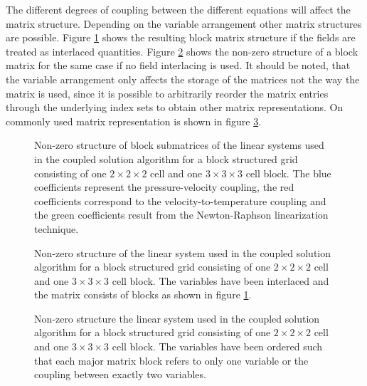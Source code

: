 The different degrees of coupling between the different equations will affect the matrix structure. Depending on the variable arrangement other matrix structures are possible. Figure \ref{fig:cpldassemble} shows the resulting block matrix structure if the fields are treated as interlaced quantities. Figure \ref{fig:interlacemat} shows the non-zero structure of a block matrix for the same case if no field interlacing is used. It should be noted, that the variable arrangement only affects the storage of the matrices not the way the matrix is used, since it is possible to arbitrarily reorder the matrix entries through the underlying index sets to obtain other matrix representations. On commonly used matrix representation is shown in figure \ref{fig:nointerlacemat}.

\begin{figure}
  \centering
  \label{fig:cpldassemble}
  
  \caption{Non-zero structure of block submatrices of the linear systems used in the coupled solution algorithm for a block structured grid consisting of one $2\times2\times2$ cell and one $3\times3\times3$ cell block. The blue coefficients represent the pressure-velocity coupling, the red coefficients correspond to the velocity-to-temperature coupling and the green coefficients result from the Newton-Raphson linearization technique.}
\end{figure}

\begin{figure}
  \centering
  \label{fig:interlacemat}
  
  \caption{Non-zero structure of the linear system used in the coupled solution algorithm for a block structured grid consisting of one $2\times2\times2$ cell and one $3\times3\times3$ cell block. The variables have been interlaced and the matrix consists of blocks as shown in figure \ref{fig:cpldassemble}.}
\end{figure}

\begin{figure}
  \centering
  \label{fig:nointerlacemat}
   
  \caption{Non-zero structure the linear system used in the coupled solution algorithm for a block structured grid consisting of one $2\times2\times2$ cell and one $3\times3\times3$ cell block. The variables have been ordered such that each major matrix block refers to only one variable or the coupling between exactly two variables.}
  \label{fig:nointerlacemat}
\end{figure}
